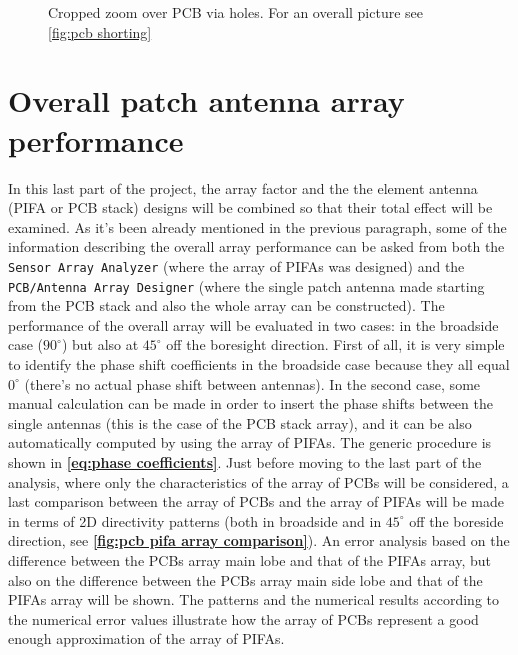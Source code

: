 \documentclass[10pt,a4paper,twocolumn]{article}
\begin{document}
{\begin{figure}[bt!]
		\def\svgwidth{\linewidth}
		\tiny{}
	\caption{Cropped zoom over PCB via holes. For an overall picture see \cref{fig:pcb shorting}}
	\label{fig:pcb shorting zoom}
\end{figure}






\section*{\selectfont\color{Turquoise}Overall patch antenna array performance}
In this last part of the project, the array factor and the the element antenna (PIFA or PCB stack) designs will be combined so that their total effect will be examined. As it's been already mentioned in the previous paragraph, some of the information describing the overall array performance can be asked from both the \texttt{\color{Mahogany}Sensor Array Analyzer} (where the array of PIFAs was designed) and the \texttt{\color{Mahogany}PCB/Antenna Array Designer} (where the single patch antenna made starting from the PCB stack and also the whole array can be constructed). The performance of the overall array will be evaluated in two cases: in the broadside case ($90^\circ$) but also at $45^\circ$ off the boresight direction. First of all, it is very simple to identify the phase shift coefficients in the broadside case because they all equal $0^\circ$ (there's no actual phase shift between antennas). In the second case, some manual calculation can be made in order to insert the phase shifts between the single antennas (this is the case of the PCB stack array), and it can be also automatically computed by using the array of PIFAs. The generic procedure is shown in \textbf{\cref{eq:phase coefficients}}. Just before moving to the last part of the analysis, where only the characteristics of the array of PCBs will be considered, a last comparison between the array of PCBs and the array of PIFAs will be made in terms of 2D directivity patterns (both in broadside and in $45^\circ$ off the boreside direction, see \textbf{\cref{fig:pcb pifa array comparison}}). An error analysis based on the difference between the PCBs array main lobe and that of the PIFAs array, but also on the difference between the PCBs array main side lobe and that of the PIFAs array will be shown. The patterns and the numerical results according to the numerical error values illustrate how the array of PCBs represent a good enough approximation of the array of PIFAs. 

}
\end{document}
